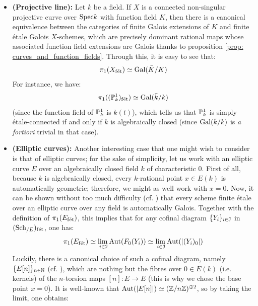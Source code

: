             \begin{example} \label{example: etale_fundamental_group_of_a_curve}
                \noindent
                \begin{itemize}
                    \item \textbf{(Projective line):} Let $k$ be a field. If $X$ is a connected non-singular projective curve over $\Spec k$ with function field $K$, then there is a canonical equivalence between the categories of finite Galois extensions of $K$ and finite \'etale Galois $X$-schemes, which are precisely dominant rational maps whose associated function field extensions are Galois thanks to proposition \ref{prop: curves_and_function_fields}. Through this, it is easy to see that:
                        $$\pi_1(X_{\fet}) \cong \Gal(\bar{K}/K)$$
                    For instance, we have:
                        $$\pi_1((\P^1_k)_{\fet}) \cong \Gal(\bar{k}/k)$$
                    (since the function field of $\P^1_k$ is $k(t)$), which tells us that $\P^1_k$ is simply \'etale-connected if and only if $k$ is algebraically closed (since $\Gal(\bar{k}/k)$ is \textit{a fortiori} trivial in that case). 
                    \item \textbf{(Elliptic curves):} Another interesting case that one might wish to consider is that of elliptic curves; for the sake of simplicity, let us work with an elliptic curve $E$ over an algebraically closed field $k$ of characteristic $0$. First of all, because $k$ is algebraically closed, every $k$-rational point $x \in E(k)$ is automatically geometric; therefore, we might as well work with $x = 0$. Now, it can be shown without too much difficulty (cf. \cite[Proposition 5.11]{kundu_etale_fundamental_group_of_elliptic_curves}) that every scheme finite \'etale over an elliptic curve over any field is automatically Galois. Together with the definition of $\pi_1(E_{\fet})$, this implies that for any cofinal diagram $\{Y_i\}_{i \in \calI}$ in $(\Sch_{/E})_{\fet}$, one has:
                        $$\pi_1(E_{\fet}) \cong \underset{i \in \calI}{\lim} \Aut(F_0(Y_i)) \cong \underset{i \in \calI}{\lim} \Aut(|(Y_i)_0|)$$
                    Luckily, there is a canonical choice of such a cofinal diagram, namely $\{E[n]\}_{n \in \N}$ (cf. \cite[Proposition 3.8]{kundu_etale_fundamental_group_of_elliptic_curves}), which are nothing but the fibres over $0 \in E(k)$ (i.e. kernels) of the $n$-torsion maps $[n]: E \to E$ (this is why we chose the base point $x = 0$). It is well-known that $\Aut(|E[n]|) \cong (\Z/n\Z)^{\oplus 2}$, so by taking the limit, one obtains:

\end{itemize}
\end{example}
